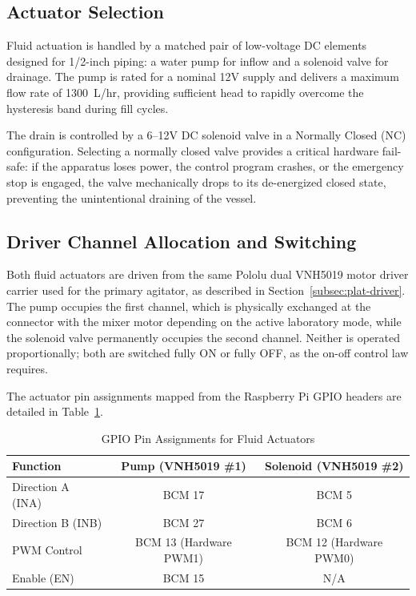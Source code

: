 \subsection{Actuator Selection}
\label{subsec:proc-actuator-sel}

Fluid actuation is handled by a matched pair of low-voltage DC elements designed for 1/2-inch piping: a water pump for inflow and a solenoid valve for drainage. The pump is rated for a nominal 12V supply and delivers a maximum flow rate of 1300~L/hr, providing sufficient head to rapidly overcome the hysteresis band during fill cycles. 

The drain is controlled by a 6--12V DC solenoid valve in a Normally Closed (NC) configuration. Selecting a normally closed valve provides a critical hardware fail-safe: if the apparatus loses power, the control program crashes, or the emergency stop is engaged, the valve mechanically drops to its de-energized closed state, preventing the unintentional draining of the vessel.

\subsection{Driver Channel Allocation and Switching}
\label{subsec:proc-channels}

Both fluid actuators are driven from the same Pololu dual VNH5019 motor driver carrier used for the primary agitator, as described in Section~\ref{subsec:plat-driver}. The pump occupies the first channel, which is physically exchanged at the connector with the mixer motor depending on the active laboratory mode, while the solenoid valve permanently occupies the second channel. Neither is operated proportionally; both are switched fully ON or fully OFF, as the on-off control law requires.

The actuator pin assignments mapped from the Raspberry Pi GPIO headers are detailed in Table~\ref{tab:fluid_gpio}.

\begin{table}[ht]
    \centering
    \caption{GPIO Pin Assignments for Fluid Actuators}
    \label{tab:fluid_gpio}
    \begin{tabular}{lcc}
        \toprule
        \textbf{Function} & \textbf{Pump (VNH5019 \#1)} & \textbf{Solenoid (VNH5019 \#2)} \\
        \midrule
        Direction A (INA) & BCM 17 & BCM 5 \\
        Direction B (INB) & BCM 27 & BCM 6 \\
        PWM Control       & BCM 13 (Hardware PWM1) & BCM 12 (Hardware PWM0) \\
        Enable (EN)       & BCM 15 & N/A \\
        \bottomrule
    \end{tabular}
\end{table}


